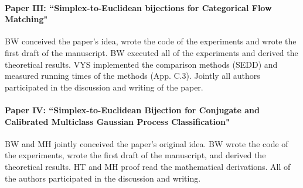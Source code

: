 \paragraph{Paper III: ``Simplex-to-Euclidean bijections for Categorical Flow Matching"}
BW conceived the paper's idea, wrote the code of the experiments and wrote the first draft of the manuscript. 
BW executed all of the experiments and derived the theoretical results. VYS implemented  the comparison methods (SEDD) and measured running times of the methods (App. C.3). Jointly all authors participated in the discussion and writing of the paper.


\paragraph{Paper IV: ``Simplex-to-Euclidean Bijection for Conjugate and Calibrated Multiclass Gaussian Process Classification"}
BW and MH jointly conceived the paper's original idea. BW wrote the code of the experiments, wrote the first draft of the manuscript, and derived the theoretical results. HT and MH proof read the mathematical derivations. All of the authors  participated in the discussion and writing.  
